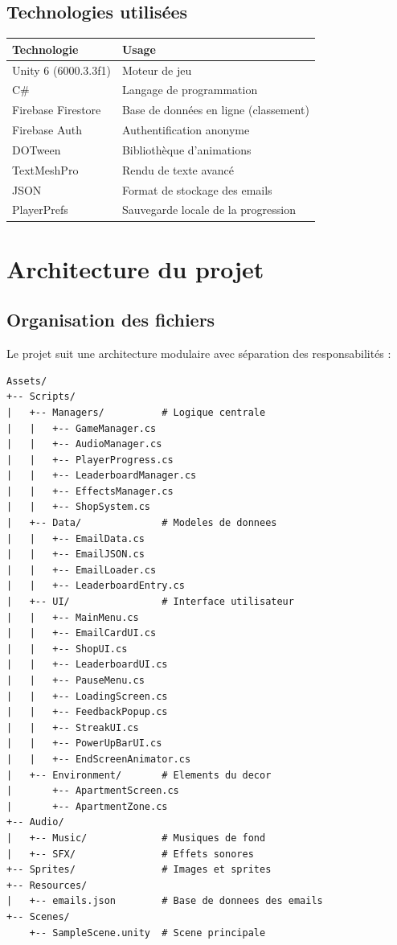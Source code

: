 \documentclass[12pt,a4paper]{article}
\begin{document}
\subsection{Technologies utilisées}
\begin{longtable}{|l|l|}
\hline
\textbf{Technologie} & \textbf{Usage} \\
\hline
Unity 6 (6000.3.3f1) & Moteur de jeu \\
\hline
C\# & Langage de programmation \\
\hline
Firebase Firestore & Base de données en ligne (classement) \\
\hline
Firebase Auth & Authentification anonyme \\
\hline
DOTween & Bibliothèque d'animations \\
\hline
TextMeshPro & Rendu de texte avancé \\
\hline
JSON & Format de stockage des emails \\
\hline
PlayerPrefs & Sauvegarde locale de la progression \\
\hline
\end{longtable}

\section{Architecture du projet}

\subsection{Organisation des fichiers}
Le projet suit une architecture modulaire avec séparation des responsabilités :

\begin{verbatim}
Assets/
+-- Scripts/
|   +-- Managers/          # Logique centrale
|   |   +-- GameManager.cs
|   |   +-- AudioManager.cs
|   |   +-- PlayerProgress.cs
|   |   +-- LeaderboardManager.cs
|   |   +-- EffectsManager.cs
|   |   +-- ShopSystem.cs
|   +-- Data/              # Modeles de donnees
|   |   +-- EmailData.cs
|   |   +-- EmailJSON.cs
|   |   +-- EmailLoader.cs
|   |   +-- LeaderboardEntry.cs
|   +-- UI/                # Interface utilisateur
|   |   +-- MainMenu.cs
|   |   +-- EmailCardUI.cs
|   |   +-- ShopUI.cs
|   |   +-- LeaderboardUI.cs
|   |   +-- PauseMenu.cs
|   |   +-- LoadingScreen.cs
|   |   +-- FeedbackPopup.cs
|   |   +-- StreakUI.cs
|   |   +-- PowerUpBarUI.cs
|   |   +-- EndScreenAnimator.cs
|   +-- Environment/       # Elements du decor
|       +-- ApartmentScreen.cs
|       +-- ApartmentZone.cs
+-- Audio/
|   +-- Music/             # Musiques de fond
|   +-- SFX/               # Effets sonores
+-- Sprites/               # Images et sprites
+-- Resources/
|   +-- emails.json        # Base de donnees des emails
+-- Scenes/
    +-- SampleScene.unity  # Scene principale
\end{verbatim}
\end{document}
